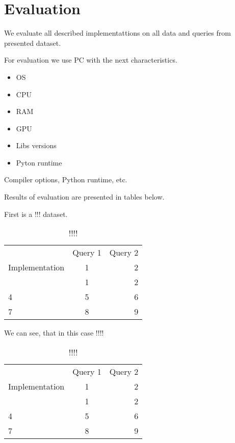 \section{Evaluation}

We evaluate all described implementattions on all data and queries from presented dataset.

For evaluation we use PC with the next characteristics.
\begin{itemize}
  \item OS
  \item CPU
  \item RAM
  \item GPU
  \item Libs versions
  \item Pyton runtime
\end{itemize}

Compiler options, Python runtime, etc.

Results of evaluation are presented in tables below.

First is a !!! dataset.

\begin{table}
\caption{!!!!}
\label{tbl:table1}
\begin{tabular}{ l | c | r }
    \hline
    \multirow{3}{*}{Implementation} & Query 1 & Query 2 \\
                                    & 1 & 2 \\
                                    & 1 & 2 \\ \hline
    4 & 5 & 6 \\ \hline
    7 & 8 & 9 \\
    \hline
  \end{tabular}
\end{table}


We can see, that in this case !!!!


\begin{table}
\caption{!!!!}
\label{tbl:table1}
\begin{tabular}{ l | c | r }
    \hline
    \multirow{3}{*}{Implementation} & Query 1 & Query 2 \\
                                    & 1 & 2 \\
                                    & 1 & 2 \\ \hline
    4 & 5 & 6 \\ \hline
    7 & 8 & 9 \\
    \hline
  \end{tabular}
\end{table}


